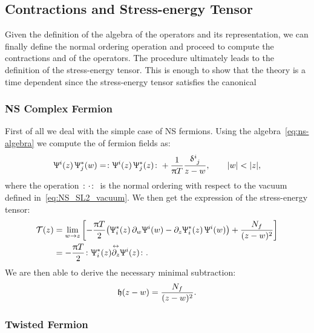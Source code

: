 \subsection{Contractions and Stress-energy Tensor}
\label{sec:contraction_and_T}

Given the definition of the algebra of the operators and its representation, we can finally define the normal ordering operation and proceed to compute the contractions and \ope of the operators.
The procedure ultimately leads to the definition of the stress-energy tensor. This is enough to show that the theory is a time dependent \cft since the stress-energy tensor satisfies the canonical \ope


\subsubsection{NS Complex Fermion}

First of all we deal with the simple case of NS fermions.
Using the algebra~\eqref{eq:ns-algebra} we compute the \ope of fermion fields as:
\begin{equation}
  \Psi^i( z )\, \Psi^*_j( w )
  =
  \no{\Psi^i( z )\, \Psi^*_j( z )}
  +
  \frac{1}{\pi T} \frac{\tensor{\delta}{^i_j}}{ z - w },
  \qquad
  \abs{w} < \abs{z},
\end{equation}
where the operation $\colon \cdot \colon$ is the normal ordering with respect to the  vacuum defined in~\eqref{eq:NS_SL2_vacuum}.
We then get the expression of the stress-energy tensor:
\begin{equation}
  \begin{split}
    \cT( z )
    & =
    \lim\limits_{w \to z}
    \qty[%
      -\frac{ \pi T }{2}
      \qty( \Psi^*_i( z )\, \ipd{w} \Psi^i( w ) - \ipd{z} \Psi^*_i( z )\, \Psi^i( w ) )
      +
      \frac{N_f}{ ( z - w )^2 }
    ]
    \\
    & =
    -\frac{\pi T}{2} \no{ \Psi^*_i( z ) \lripd{z} \Psi^i( z ) }.
  \end{split}
\end{equation}
We are then able to derive the necessary minimal subtraction:
\begin{equation}
  \mathfrak{h}( z - w ) = \frac{N_f}{( z - w )^2}.
\end{equation}


\subsubsection{Twisted Fermion}

